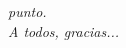 \newpage

\thispagestyle{empty}
\begin{tiny}

\end{tiny}

\vspace{5cm}

\begin{flushright}
\begin{large}
\textit{punto.}\\
\hfill
\textit{A todos, gracias...}
\end{large}
\end{flushright}